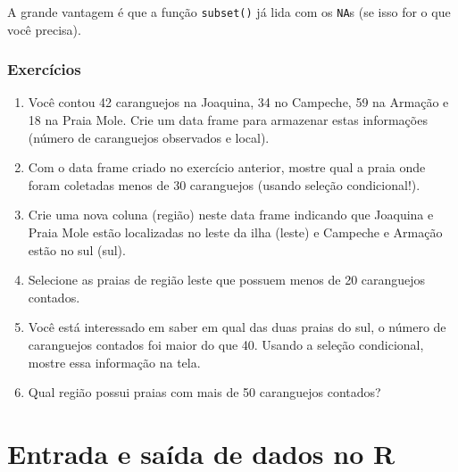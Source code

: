 \documentclass[10pt,a4paper]{book}
\newenvironment{Shaded}{\begin{snugshade}}{\end{snugshade}}
\newcommand{\KeywordTok}[1]{\textcolor[rgb]{0.13,0.29,0.53}{\textbf{#1}}}
\newcommand{\DataTypeTok}[1]{\textcolor[rgb]{0.13,0.29,0.53}{#1}}
\newcommand{\DecValTok}[1]{\textcolor[rgb]{0.00,0.00,0.81}{#1}}
\newcommand{\StringTok}[1]{\textcolor[rgb]{0.31,0.60,0.02}{#1}}
\newcommand{\OtherTok}[1]{\textcolor[rgb]{0.56,0.35,0.01}{#1}}
\newcommand{\OperatorTok}[1]{\textcolor[rgb]{0.81,0.36,0.00}{\textbf{#1}}}
\newcommand{\NormalTok}[1]{#1}
\providecommand{\tightlist}{%
  \setlength{\itemsep}{0pt}\setlength{\parskip}{0pt}}
\begin{document}
\begin{Shaded}
\end{Shaded}

A grande vantagem é que a função \texttt{subset()} já lida com os
\texttt{NA}s (se isso for o que você precisa).

\subsection*{Exercícios}\label{exercuxedcios-8}


\begin{enumerate}
\def\labelenumi{\arabic{enumi}.}
\tightlist
\item
  Você contou 42 caranguejos na Joaquina, 34 no Campeche, 59 na Armação
  e 18 na Praia Mole. Crie um data frame para armazenar estas
  informações (número de caranguejos observados e local).
\item
  Com o data frame criado no exercício anterior, mostre qual a praia
  onde foram coletadas menos de 30 caranguejos (usando seleção
  condicional!).
\item
  Crie uma nova coluna (região) neste data frame indicando que Joaquina
  e Praia Mole estão localizadas no leste da ilha (leste) e Campeche e
  Armação estão no sul (sul).
\item
  Selecione as praias de região leste que possuem menos de 20
  caranguejos contados.
\item
  Você está interessado em saber em qual das duas praias do sul, o
  número de caranguejos contados foi maior do que 40. Usando a seleção
  condicional, mostre essa informação na tela.
\item
  Qual região possui praias com mais de 50 caranguejos contados?
\end{enumerate}

\chapter{Entrada e saída de dados no
R}\label{entrada-e-sauxedda-de-dados-no-r}
\end{document}

